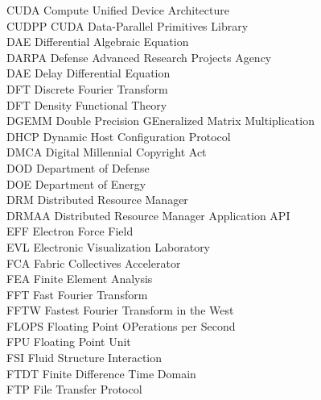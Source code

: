 \begin{tabbing}
CUDA    \> Compute Unified Device Architecture\\
CUDPP   \> CUDA Data-Parallel Primitives Library\\
DAE     \> Differential Algebraic Equation\\
DARPA   \> Defense Advanced Research Projects Agency\\
DAE     \> Delay Differential Equation\\
DFT     \> Discrete Fourier Transform\\
DFT     \> Density Functional Theory\\
DGEMM   \> Double Precision GEneralized Matrix Multiplication\\
DHCP    \> Dynamic Host Configuration Protocol\\
DMCA    \> Digital Millennial Copyright Act\\
DOD     \> Department of Defense\\
DOE     \> Department of Energy\\
DRM     \> Distributed Resource Manager\\
DRMAA   \> Distributed Resource Manager  Application API\\
EFF     \> Electron Force Field\\
EVL     \> Electronic Visualization Laboratory\\
FCA     \> Fabric Collectives Accelerator\\
FEA     \> Finite Element Analysis\\
FFT     \> Fast Fourier Transform\\
FFTW    \> Fastest Fourier Transform in the West\\
FLOPS   \> Floating Point OPerations per Second\\
FPU     \> Floating Point Unit\\
FSI     \> Fluid Structure Interaction\\
FTDT    \> Finite Difference Time Domain\\
FTP     \> File Transfer Protocol
\end{tabbing}